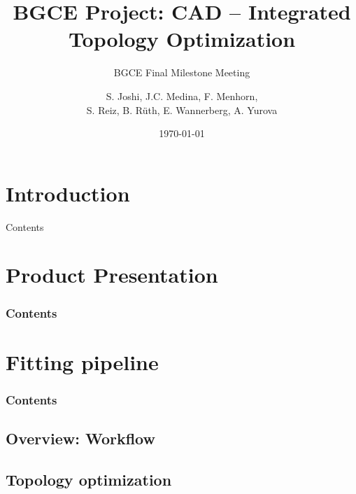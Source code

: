 \documentclass[9pt,pdftex]{beamer}
\title{BGCE Project: CAD -- Integrated Topology Optimization}
\subtitle{BGCE Final Milestone Meeting}
\author[S. Joshi, S. Reiz] {
S. Joshi, J.C. Medina, F. Menhorn, 
\\
S. Reiz, B. Rüth, E. Wannerberg, A. Yurova} %
\date{\today}
\institute{Technische Universität München}
\begin{document}
\frame{\maketitle}

\section*{Introduction}

\begin{frame}{Contents}
\tableofcontents
\end{frame}

\section{Product Presentation}
  \begin{frame}
  \frametitle{Contents}
  \tableofcontents[currentsection]
  \end{frame}

\section{Fitting pipeline}

  \begin{frame}
  \frametitle{Contents}
  \tableofcontents[currentsection]
  \end{frame}

\subsection{Overview: Workflow}


%



\subsection{Topology optimization}

\end{document}
